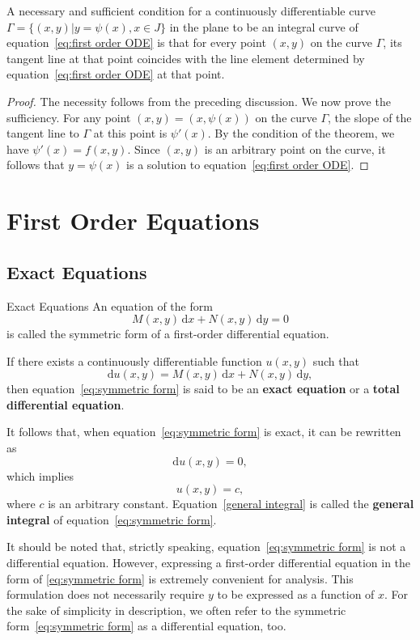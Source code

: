 \documentclass[11pt]{elegantbook}
\begin{document}
\begin{theorem}
    A necessary and sufficient condition for a continuously differentiable curve 
    $\Gamma = \{ (x,y) | y = \psi(x), x \in J \}$ in the plane 
    to be an integral curve of equation~\eqref{eq:first order ODE} is that 
    for every point $(x, y)$ on the curve $\Gamma$, 
    its tangent line at that point coincides with the line element determined 
    by equation~\eqref{eq:first order ODE} at that point.
\end{theorem}

\begin{proof}
    The necessity follows from the preceding discussion. 
    We now prove the sufficiency. 
    For any point $(x, y) = (x, \psi(x))$ on the curve $\Gamma$, 
    the slope of the tangent line to $\Gamma$ at this point is $\psi'(x)$. 
    By the condition of the theorem, we have $\psi'(x) = f(x, y)$. 
    Since $(x, y)$ is an arbitrary point on the curve, it follows that $y = \psi(x)$ is a solution to equation~\eqref{eq:first order ODE}. 
\end{proof}

\chapter{First Order Equations}
\section{Exact Equations}
\begin{definition}{Exact Equations}
An equation of the form
\begin{equation}\label{eq:symmetric form}
    M(x,y) \, \mathrm{d}x + N(x,y) \, \mathrm{d}y = 0
\end{equation}
is called the symmetric form of a first-order differential equation.

If there exists a continuously differentiable function $u(x,y)$ such that
\[
\mathrm{d}u(x,y) = M(x,y) \, \mathrm{d}x + N(x,y) \, \mathrm{d}y,
\]
then equation~\eqref{eq:symmetric form} is said to be an \textbf{exact equation} or a \textbf{total differential equation}.

It follows that, when equation~\eqref{eq:symmetric form} is exact, it can be rewritten as
\[
\mathrm{d}u(x,y) = 0,
\]
which implies
\begin{equation}\label{general integral}
    u(x,y) = c,
\end{equation}
where $c$ is an arbitrary constant. Equation~\eqref{general integral} is called the \textbf{general integral} of equation~\eqref{eq:symmetric form}.
\end{definition}
\begin{remark}
    It should be noted that, strictly speaking, 
    equation~\eqref{eq:symmetric form} is not a differential equation. 
    However, expressing a first-order differential equation in the form of \eqref{eq:symmetric form} is extremely convenient for analysis.
    This formulation does not necessarily require $y$ to be expressed as a function of $x$. 
    For the sake of simplicity in description, we often refer to the symmetric form~\eqref{eq:symmetric form} as a differential equation, too.
\end{remark}
\end{document}
